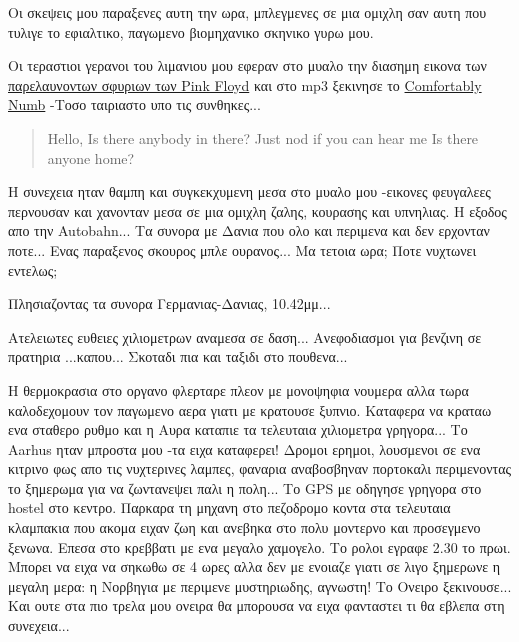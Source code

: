Οι σκεψεις μου παραξενες αυτη την ωρα, μπλεγμενες σε μια ομιχλη σαν αυτη που τυλιγε το εφιαλτικο, παγωμενο βιομηχανικο σκηνικο γυρω μου.

Οι τεραστιοι γερανοι του λιμανιου μου εφεραν στο μυαλο την διασημη εικονα των \href{http://upload.wikimedia.org/wikipedia/en/0/03/Pinkfloydhammers.jpg}{παρελαυνοντων σφυριων των Pink Floyd} και στο mp3 ξεκινησε το \href{http://www.youtube.com/watch?v=jySUpMqmzd4}{Comfortably Numb} -Tοσο ταιριαστο υπο τις συνθηκες...

\begin{verse}
Hello,
Is there anybody in there?
Just nod if you can hear me
Is there anyone home?
\end{verse}

Η συνεχεια ηταν θαμπη και συγκεκχυμενη μεσα στο μυαλο μου -εικονες φευγαλεες περνουσαν και χανονταν μεσα σε μια ομιχλη ζαλης, κουρασης και υπνηλιας. Η εξοδος απο την Autobahn... Τα συνορα με Δανια που ολο και περιμενα και δεν ερχονταν ποτε... Ενας παραξενος σκουρος μπλε ουρανος... Μα τετοια ωρα; Ποτε νυχτωνει εντελως; 

Πλησιαζοντας τα συνορα Γερμανιας-Δανιας, 10.42μμ...


Ατελειωτες ευθειες χιλιομετρων αναμεσα σε δαση... Ανεφοδιασμοι για βενζινη σε πρατηρια ...καπου... Σκοταδι πια και ταξιδι στο πουθενα...


Η θερμοκρασια στο οργανο φλερταρε πλεον με μονοψηφια νουμερα αλλα τωρα καλοδεχομουν τον παγωμενο αερα γιατι με κρατουσε ξυπνιο. Καταφερα να κραταω ενα σταθερο ρυθμο και η Αυρα καταπιε τα τελευταια χιλιομετρα γρηγορα... 
Το Aarhus ηταν μπροστα μου -τα ειχα καταφερει! Δρομοι ερημοι, λουσμενοι σε ενα κιτρινο φως απο τις νυχτερινες λαμπες, φαναρια αναβοσβηναν πορτοκαλι περιμενοντας το ξημερωμα για να ζωντανεψει παλι η πολη... 
Το GPS με οδηγησε γρηγορα στο hostel στο κεντρο. 
Παρκαρα τη μηχανη στο πεζοδρομο κοντα στα τελευταια κλαμπακια που ακομα ειχαν ζωη και ανεβηκα στο πολυ μοντερνο και προσεγμενο ξενωνα. 
Επεσα στο κρεββατι με ενα μεγαλο χαμογελο. Το ρολοι εγραφε 2.30 το πρωι. 
Μπορει να ειχα να σηκωθω σε 4 ωρες αλλα δεν με ενοιαζε γιατι σε λιγο ξημερωνε η μεγαλη μερα: η Νορβηγια με περιμενε μυστηριωδης, αγνωστη! 
Το Ονειρο ξεκινουσε... Και ουτε στα πιο τρελα μου ονειρα θα μπορουσα να ειχα φανταστει τι θα εβλεπα στη συνεχεια...
